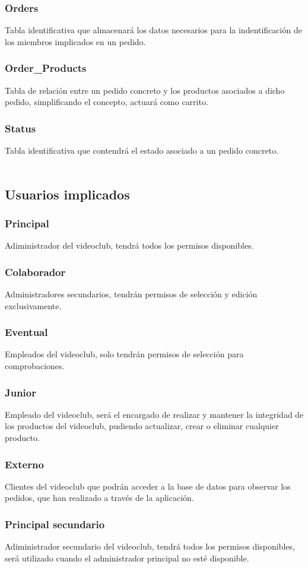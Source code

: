 \documentclass{article}
\begin{document}
\subsubsection{Orders}
Tabla identificativa que almacenará los datos necesarios para la indentificación de los miembros implicados en un pedido.
\subsubsection{Order\_Products}
Tabla de relación entre un pedido concreto y los productos asociados a dicho pedido, simplificando el concepto, actuará como carrito.
\subsubsection{Status}
Tabla identificativa que contendrá el estado asociado a un pedido concreto.
\\
\\
\subsection{Usuarios implicados}
\subsubsection{Principal}
Adiministrador del videoclub, tendrá todos los permisos disponibles.

\subsubsection{Colaborador}
Administradores secundarios, tendrán permisos de selección y edición exclusivamente.

\subsubsection{Eventual}
Empleados del videoclub, solo tendrán permisos de selección para comprobaciones. 

\subsubsection{Junior}
Empleado del videoclub, será el encargado de realizar y mantener la integridad de los productos del videoclub, pudiendo actualizar, crear o eliminar cualquier producto.

\subsubsection{Externo}
Clientes del videoclub que podrán acceder a la base de datos para observar los pedidos, que han realizado a través de la aplicación.


\subsubsection{Principal secundario}
Adiministrador secundario del videoclub, tendrá todos los permisos disponibles, será utilizado cuando el administrador principal no esté disponible.
 
\end{document}
